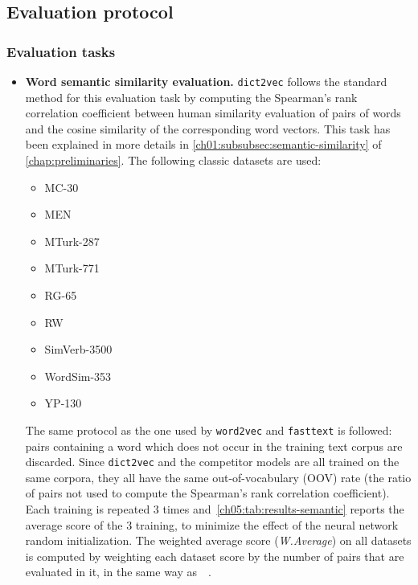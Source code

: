  \subsection{Evaluation protocol}
    \label{ch05:subsec:evaluation-protocol}
    \subsubsection{Evaluation tasks}
      \begin{itemize}
        \item \textbf{Word semantic similarity evaluation.} \texttt{dict2vec}
          follows the standard method for this evaluation task by computing the
          Spearman's rank correlation coefficient \citep{spearman1904proof}
          between human similarity evaluation of pairs of words and the cosine
          similarity of the corresponding word vectors. This task has been
          explained in more details in
          \autoref{ch01:subsubsec:semantic-similarity} of
          \autoref{chap:preliminaries}. The following classic datasets are used:
          \begin{itemize}
            \item MC-30 \citep{miller1991contextual}
            \item MEN \citep{bruni2014multimodal}
            \item MTurk-287 \citep{radinsky2011word}
            \item MTurk-771 \citep{halawi2012large}
            \item RG-65 \citep{rubenstein1965contextual}
            \item RW \citep{luong2013better}
            \item SimVerb-3500 \citep{gerz2016simverb}
            \item WordSim-353 \citep{finkelstein2001placing}
            \item YP-130 \citep{yang2006verb}
          \end{itemize}
          The same protocol as the one used by \texttt{word2vec} and
          \texttt{fasttext} is followed: pairs containing a word which does not
          occur in the training text corpus are discarded. Since
          \texttt{dict2vec} and the competitor models are all trained on the
          same corpora, they all have the same out-of-vocabulary (OOV) rate (the
          ratio of pairs not used to compute the Spearman's rank correlation
          coefficient). Each training is repeated 3 times
          and~\autoref{ch05:tab:results-semantic} reports the average score of
          the 3 training, to minimize the effect of the neural network random
          initialization. The weighted average score (\textit{W.Average}) on all
          datasets is computed by weighting each dataset score by the number of
          pairs that are evaluated in it, in the same way
          as~\citeauthor{iacobacci2016embeddings}~\citep{iacobacci2016embeddings}.


\end{itemize}
